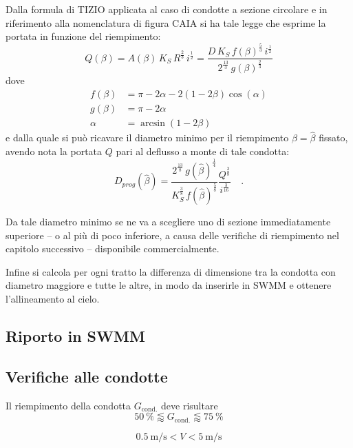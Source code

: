 Dalla formula di TIZIO applicata al caso di condotte a sezione circolare e in riferimento alla nomenclatura di figura CAIA si ha tale legge che esprime la portata in funzione del riempimento:
\begin{equation}
    Q(\beta) 
    = A(\beta) \, K_S \, R^{\tfrac{2}{3}} \, i^{\tfrac{1}{2}} 
    = \frac{ D \, K_S \, f(\beta)^{\tfrac{5}{3}} \, i^{\tfrac{1}{2}} }{ 2^{\tfrac{13}{3}} \, g(\beta)^{\tfrac{2}{3}} }
\end{equation}
dove 
\begin{align}
    f(\beta) &= \pi - 2 \alpha - 2 (1 - 2 \beta) \cos(\alpha) \\
    g(\beta) &= \pi - 2 \alpha \\
    \alpha &= \arcsin(1 - 2 \beta)
\end{align}
e dalla quale si può ricavare il diametro minimo per il riempimento $\beta = \hat{\beta}$ fissato, avendo nota la portata $Q$ pari al deflusso a monte di tale condotta:
\begin{equation}
    D_{prog}(\hat{\beta}) = \frac{ 2^{\tfrac{13}{8}} \, g(\hat{\beta})^{\tfrac{1}{4}} }{     K_S^{\tfrac{3}{8}} \, f(\hat{\beta})^{\tfrac{5}{8}} } \frac{Q^{\tfrac{3}{8}}}{i^{\tfrac{3}{16}}} \quad .
\end{equation} 

Da tale diametro minimo se ne va a scegliere uno di sezione immediatamente superiore -- o al più di poco inferiore, a causa delle verifiche di riempimento nel capitolo successivo -- disponibile commercialmente.

Infine si calcola per ogni tratto la differenza di dimensione tra la condotta con diametro maggiore e tutte le altre, in modo da inserirle in SWMM e ottenere l'allineamento al cielo.

\subsection{Riporto in SWMM}
\subsection{Verifiche alle condotte}
Il riempimento della condotta $G_\text{cond.}$ deve risultare 
\begin{equation}
    \SI{50}{\percent} \lessapprox G_\text{cond.} \lessapprox\SI{75}{\percent}
\end{equation}


\begin{equation}
    \SI{0.5}{\metre\per\second} < V <  \SI{5}{\metre\per\second}
\end{equation}

